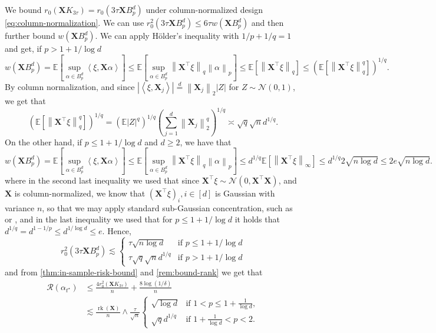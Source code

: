 \documentclass[a4paper]{article}
\newcommand{\pr}[1]{\left(#1\right)}
\newcommand{\br}[1]{\left[#1\right]}
\newcommand{\abs}[1]{\left\lvert#1\right\rvert}
\newcommand{\norm}[1]{\left\|#1\right\|}
\newcommand{\inner}[2]{\left\langle #1,#2\right\rangle}
\newcommand{\X}[0]{\mathbf{X}}
\newcommand{\EE}[0]{\mathbb{E}}
\newcommand{\cN}[0]{\mathcal{N}}
\newcommand{\cR}[0]{\mathcal{R}}
\newcommand{\alphatstar}[0]{\alpha_{t^\star}}
\newcommand{\rzero}[0]{r_{0}}
\DeclareMathOperator{\rankOp}{rk}
\newcommand{\rank}[1]{\rankOp\pr{#1}}
\theoremstyle{thmstyle}
\theoremstyle{defstyle}
\theoremstyle{remark}
\begin{document}
    
    We bound $\rzero(\X K_{3\tau})=\rzero(3\tau\X B_p^d)$ under column-normalized design \eqref{eq:column-normalization}. We can use $\rzero^2(3\tau \X B_p^d)\leq 6\tau w(\X B_p^d)$ and then further bound $w(\X B_p^d)$. We can apply Hölder's inequality with $1/p+1/q=1$ and get, if $p> 1+1/\log d$
    \begin{equation*}
        w(\X B_p^d)=\EE\br{\sup_{\alpha\in B_p^d}\inner{\xi}{\X\alpha}} \leq \EE\br{\sup_{\alpha\in B_p^d}\norm{\X^\top\xi}_q\norm{\alpha}_p} \leq \EE\br{\norm{\X^\top\xi}_{q}} \leq \pr{\EE\br{\norm{\X^\top\xi}_{q}^q}}^{1/q}.
    \end{equation*}
    By column normalization, and since $\abs{\inner{\xi}{\X_j}} \stackrel{d}{=} \norm{\X_j}_2\abs{Z}$ for $Z\sim\cN(0,1)$, we get that
    \begin{equation*}
        \pr{\EE\br{\norm{\X^\top\xi}_{q}^q}}^{1/q} = (\EE \abs{Z}^q)^{1/q} \pr{\sum_{j=1}^d\norm{\X_j}_2^q}^{1/q} \asymp \sqrt{q} \sqrt{n} d^{1/q}.
    \end{equation*}
    On the other hand, if $p\leq 1+1/\log d$ and $d\geq 2$, we have that
    \begin{equation*}
        w(\X B_p^d)=\EE\br{\sup_{\alpha\in B_p^d}\inner{\xi}{\X\alpha}} \leq \EE\br{\sup_{\alpha\in B_p^d}\norm{\X^\top\xi}_q\norm{\alpha}_p} \leq d^{1/q}\EE\br{\norm{\X^\top\xi}_{\infty}} \leq d^{1/q}2\sqrt{n\log d} \leq 2e\sqrt{n\log d}.
    \end{equation*}
    where in the second last inequality we used that since $\X^\top\xi\sim \cN(0,\X^\top\X)$, and $\X$ is column-normalized, we know that $(\X^\top\xi)_i,i\in[d]$ is Gaussian with variance $n$, so that we may apply standard sub-Gaussian concentration, such as \cite[Exercise 2.5.10]{Vershynin2018} or \cite[Exercise 2.12]{Wainwright2019}, and in the last inequality we used that for $p\leq 1+1/\log d$ it holds that $d^{1/q}=d^{1-1/p}\leq d^{1/\log d}\leq e$.
    Hence, 
    \begin{equation}
        \label{eq:p-norm-radius-bound}
        \rzero^2(3\tau \X B_p^d)\lesssim 
    \begin{cases} 
         \tau \sqrt{n\log d} & \text{if } p\leq 1+1/\log d \\
         \tau \sqrt{q}\sqrt{n}d^{1/q} & \text{if } p> 1+1/\log d
    \end{cases}
    \end{equation}
    and from \cref{thm:in-sample-risk-bound} and \cref{rem:bound-rank} we get that
    \begin{align*}
        \cR(\alphatstar) &\leq \frac{4\rzero^2(\X K_{3\tau})}{n}+\frac{8\log(1/\delta)}{n} \\
        &\lesssim \frac{\rank{\X}}{n}\wedge 
        \frac{\tau}{\sqrt{n}}
        \begin{cases}
            \sqrt{\log d} & \text{if } 1<p\leq 1+\frac{1}{\log d},\\
            \sqrt{q} d^{1/q} & \text{if } 1+\frac{1}{\log d}< p < 2.
        \end{cases}
    \end{align*}
\end{document}
